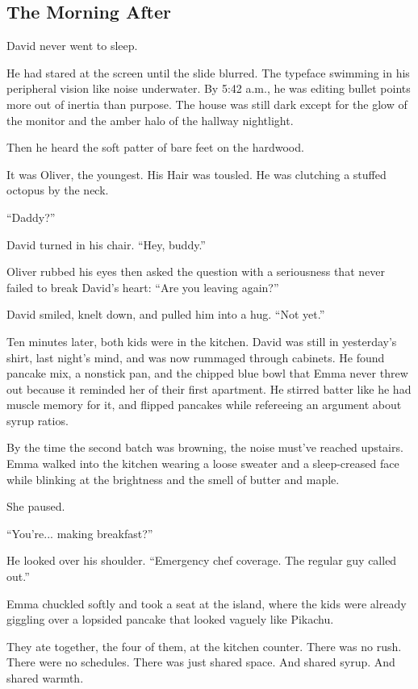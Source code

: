 \subsection{The Morning After}

David never went to sleep.

He had stared at the screen until the slide blurred. The typeface swimming in his peripheral vision 
like noise underwater. By 5:42 a.m., he was editing bullet points more out of inertia than purpose. 
The house was still dark except for the glow of the monitor and the amber halo of the hallway nightlight.

Then he heard the soft patter of bare feet on the hardwood.

It was Oliver, the youngest. His Hair was tousled. He was clutching a stuffed octopus by the neck.

``Daddy?''

David turned in his chair. ``Hey, buddy.''

Oliver rubbed his eyes then asked the question with a seriousness that never failed to break 
David’s heart: ``Are you leaving again?''

David smiled, knelt down, and pulled him into a hug. ``Not yet.''

Ten minutes later, both kids were in the kitchen. David was still in yesterday’s shirt, last night’s mind, and was 
now rummaged through cabinets. He found pancake mix, a nonstick pan, and the chipped blue bowl that Emma never 
threw out because it reminded her of their first apartment. 
He stirred batter like he had muscle memory for it,  and flipped pancakes while refereeing an 
argument about syrup ratios.

By the time the second batch was browning, the noise must’ve reached upstairs. Emma walked into the kitchen 
wearing a loose sweater and a sleep-creased face while blinking at the brightness and the smell of butter and maple.

She paused.

``You’re... making breakfast?''

He looked over his shoulder. ``Emergency chef coverage. The regular guy called out.''

Emma chuckled softly and took a seat at the island, where the kids were already giggling over a lopsided 
pancake that looked vaguely like Pikachu.

They ate together, the four of them, at the kitchen counter. 
There was no rush. 
There were no schedules. 
There was just shared space. 
And shared syrup. 
And shared warmth.

